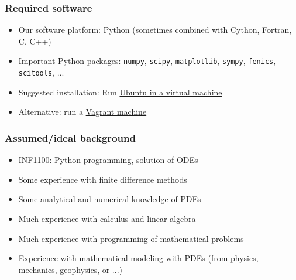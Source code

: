 \documentclass{beamer}
\begin{document}
\begin{frame}
\frametitle{Required software}

\begin{itemize}
 \item Our software platform: Python (sometimes combined with Cython,
   Fortran, C, C++)

 \item Important Python packages: \texttt{numpy}, \texttt{scipy}, \texttt{matplotlib},
   \texttt{sympy}, \texttt{fenics}, \texttt{scitools}, ...

 \item Suggested installation: Run \href{{http://hplgit.github.io/edu/accesspy/._accesspy_uio005.html}}{Ubuntu in a virtual machine}

 \item Alternative: run a \href{{http://hplgit.github.io/edu/accesspy/._accesspy_uio007.html}}{Vagrant machine}
\end{itemize}

\noindent
\end{frame}

\begin{frame}
\frametitle{Assumed/ideal background}

\begin{itemize}
 \item INF1100: Python programming, solution of ODEs

 \item Some experience with finite difference methods

 \item Some analytical and numerical knowledge of PDEs

 \item Much experience with calculus and linear algebra

 \item Much experience with programming of mathematical problems

 \item Experience with mathematical modeling with PDEs
   (from physics, mechanics, geophysics, or ...)
\end{itemize}

\noindent
\end{frame}
\end{document}
